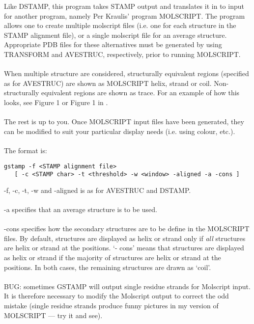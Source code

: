 Like DSTAMP, this program takes STAMP output and translates it in to input
for another program, namely Per Kraulis' program MOLSCRIPT.  The program
allows one to create multiple molscript files (i.e. one for each structure
in the STAMP alignment file), or a single molscript file for an average
structure.  Appropriate PDB files for these alternatives must be
generated by using TRANSFORM and AVESTRUC, respectively, prior to running
MOLSCRIPT.\\
\\
When multiple structure are considered, structurally equivalent regions
(specified as for AVESTRUC) are shown as MOLSCRIPT helix, strand or coil.
Non-structurally equivalent regions are shown as \Cal trace.  For an
example of how this looks, see Figure 1 \cite{rb94} or Figure 1 in 
\cite{russell94}.\\
\\
The rest is up to you.  Once MOLSCRIPT input files have been generated, they
can be modified to suit your particular display needs (i.e. using colour, 
etc.).\\
\\
The format is:\\

\begin{scriptsize}\begin{verbatim}
gstamp -f <STAMP alignment file> 
   [ -c <STAMP char> -t <threshold> -w <window> -aligned -a -cons ]
\end{verbatim} \end{scriptsize}

-f, -c, -t, -w and -aligned is as for AVESTRUC and DSTAMP.\\
\\
-a specifies that an average structure is to be used.\\
\\
-cons specifies how the secondary structures are to be define in the 
  MOLSCRIPT files.  By default, structures are displayed as helix or strand
  only if {\em all} structures are helix or strand at the positions.  `- cons'
  means that structures are displayed as helix or strand if the majority  
  of structures are helix or strand at the positions.  In both cases, the
  remaining structures are drawn as `coil'.\\
\\
BUG: sometimes GSTAMP will output single residue strands for Molscript 
input.  It is therefore necessary to modify the Molscript output to 
correct the odd mistake (single residue strands produce funny pictures
in my version of MOLSCRIPT --- try it and see).


